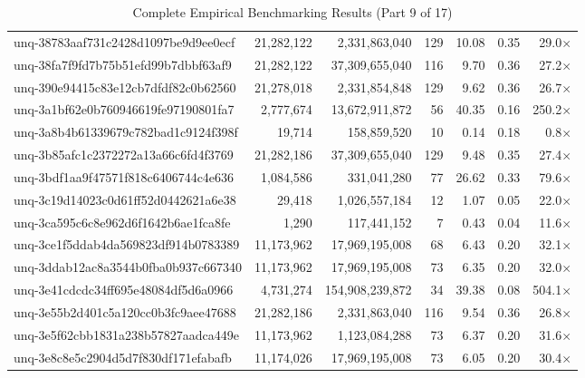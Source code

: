 \begin{table}[h!]
\begin{tabular}{lrrrrrr}
unq-38783aaf731c2428d1097be9d9ee0ecf & 21,282,122 & 2,331,863,040 & 129 & 10.08 & 0.35 & 29.0$\times$ \\
unq-38fa7f9fd7b75b51efd99b7dbbf63af9 & 21,282,122 & 37,309,655,040 & 116 & 9.70 & 0.36 & 27.2$\times$ \\
unq-390e94415c83e12cb7dfdf82c0b62560 & 21,278,018 & 2,331,854,848 & 129 & 9.62 & 0.36 & 26.7$\times$ \\
unq-3a1bf62e0b760946619fe97190801fa7 & 2,777,674 & 13,672,911,872 & 56 & 40.35 & 0.16 & 250.2$\times$ \\
unq-3a8b4b61339679c782bad1c9124f398f & 19,714 & 158,859,520 & 10 & 0.14 & 0.18 & 0.8$\times$ \\
unq-3b85afc1c2372272a13a66c6fd4f3769 & 21,282,186 & 37,309,655,040 & 129 & 9.48 & 0.35 & 27.4$\times$ \\
unq-3bdf1aa9f47571f818c6406744c4e636 & 1,084,586 & 331,041,280 & 77 & 26.62 & 0.33 & 79.6$\times$ \\
unq-3c19d14023c0d61ff52d0442621a6e38 & 29,418 & 1,026,557,184 & 12 & 1.07 & 0.05 & 22.0$\times$ \\
unq-3ca595c6c8e962d6f1642b6ae1fca8fe & 1,290 & 117,441,152 & 7 & 0.43 & 0.04 & 11.6$\times$ \\
unq-3ce1f5ddab4da569823df914b0783389 & 11,173,962 & 17,969,195,008 & 68 & 6.43 & 0.20 & 32.1$\times$ \\
unq-3ddab12ac8a3544b0fba0b937c667340 & 11,173,962 & 17,969,195,008 & 73 & 6.35 & 0.20 & 32.0$\times$ \\
unq-3e41cdcdc34ff695e48084df5d6a0966 & 4,731,274 & 154,908,239,872 & 34 & 39.38 & 0.08 & 504.1$\times$ \\
unq-3e55b2d401c5a120cc0b3fc9aee47688 & 21,282,186 & 2,331,863,040 & 116 & 9.54 & 0.36 & 26.8$\times$ \\
unq-3e5f62cbb1831a238b57827aadca449e & 11,173,962 & 1,123,084,288 & 73 & 6.37 & 0.20 & 31.6$\times$ \\
unq-3e8c8e5c2904d5d7f830df171efabafb & 11,174,026 & 17,969,195,008 & 73 & 6.05 & 0.20 & 30.4$\times$ \\
\bottomrule
\end{tabular}
\caption{Complete Empirical Benchmarking Results (Part 9 of 17)}
\end{table}

\clearpage

